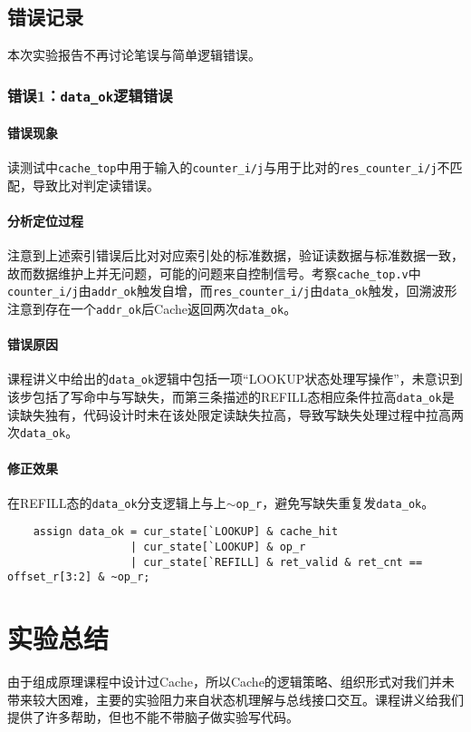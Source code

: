 \documentclass[UTF-8,twoside,c5size]{ctexart}
\begin{document}
    
	\subsection{错误记录}
    本次实验报告不再讨论笔误与简单逻辑错误。
    
	\subsubsection{错误\textbf{1：}\texttt{data\_ok}逻辑错误}
    \paragraph{错误现象}\hfill
    
    读测试中\texttt{cache\_top}中用于输入的\texttt{counter\_i/j}与用于比对的\texttt{res\_counter\_i/j}不匹配，导致比对判定读错误。
    
    \paragraph{分析定位过程}\hfill
    
    注意到上述索引错误后比对对应索引处的标准数据，验证读数据与标准数据一致，故而数据维护上并无问题，可能的问题来自控制信号。考察\texttt{cache\_top.v}中\texttt{counter\_i/j}由\texttt{addr\_ok}触发自增，而\texttt{res\_counter\_i/j}由\texttt{data\_ok}触发，回溯波形注意到存在一个\texttt{addr\_ok}后Cache返回两次\texttt{data\_ok}。
    
    \paragraph{错误原因}\hfill
    
    课程讲义中给出的\texttt{data\_ok}逻辑中包括一项“LOOKUP状态处理写操作”，未意识到该步包括了写命中与写缺失，而第三条描述的REFILL态相应条件拉高\texttt{data\_ok}是读缺失独有，代码设计时未在该处限定读缺失拉高，导致写缺失处理过程中拉高两次\texttt{data\_ok}。
    
    \paragraph{修正效果}\hfill
    
    在REFILL态的\texttt{data\_ok}分支逻辑上与上\texttt{$\mathtt{\sim}$op\_r}，避免写缺失重复发\texttt{data\_ok}。
    \begin{verbatim}
    assign data_ok = cur_state[`LOOKUP] & cache_hit
                   | cur_state[`LOOKUP] & op_r
                   | cur_state[`REFILL] & ret_valid & ret_cnt == offset_r[3:2] & ~op_r;
    \end{verbatim}
	
	\section{实验总结}
	由于组成原理课程中设计过Cache，所以Cache的逻辑策略、组织形式对我们并未带来较大困难，主要的实验阻力来自状态机理解与总线接口交互。课程讲义给我们提供了许多帮助，但也不能不带脑子做实验写代码。
	
\end{document}
